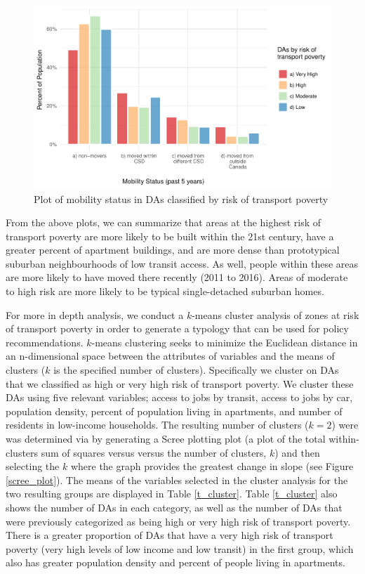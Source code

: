 \documentclass[11 pt, letterpaper]{article}
\begin{document}
{\begin{figure}[H]
	\caption{Plot of mobility status in DAs classified by risk of transport poverty} 
	\label{built_move}
	\centerline{\includegraphics[width=6.5in]{figures/built_env/built_mobility.pdf}}
	\vspace{2mm}
\end{figure}

From the above plots, we can summarize that areas at the highest risk of transport poverty are more likely to be built within the 21st century, have a greater percent of apartment buildings, and are more dense than prototypical suburban neighbourhoods of low transit access. As well, people within these areas are more likely to have moved there recently (2011 to 2016). Areas of moderate to high risk are more likely to be typical single-detached suburban homes.

For more in depth analysis, we conduct a $k$-means cluster analysis of zones at risk of transport poverty in order to generate a typology that can be used for policy recommendations. $k$-means clustering seeks to minimize the Euclidean distance in an n-dimensional space between the attributes of variables and the means of clusters ($k$ is the specified number of clusters). Specifically we cluster on DAs that we classified as high or very high risk of transport poverty. We cluster these DAs using five relevant variables; access to jobs by transit, access to jobs by car, population density, percent of population living in apartments, and number of residents in low-income households. The resulting number of clusters ($k = 2$) were was determined via by generating a Scree plotting plot (a plot of the total within-clusters sum of squares versus versus the number of clusters, $k$) and then selecting the $k$ where the graph provides the greatest change in slope (see Figure \ref{scree_plot}). The means of the variables selected in the cluster analysis for the two resulting groups are displayed in Table \ref{t_cluster}. Table \ref{t_cluster} also shows the number of DAs in each category, as well as the number of DAs that were previously categorized as being high or very high risk of transport poverty. There is a greater proportion of DAs that have a very high risk of transport poverty (very high levels of low income and low transit) in the first group, which also has greater population density and percent of people living in apartments.

}
\end{document}
